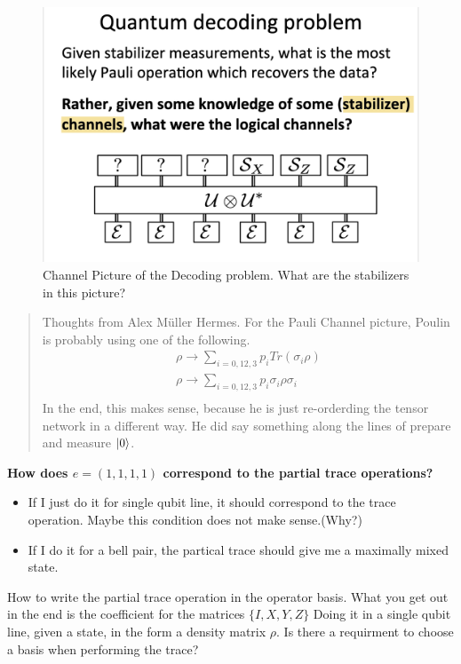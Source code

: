 \documentclass[%
 reprint,
amsmath,amssymb,
aps,
onecolumn,
]{revtex4-2}
\begin{document}
\begin{figure}[ht]
    \centering
    \includegraphics[scale=0.3]{../assets/decoding_channel_picture.png}
    \caption{Channel Picture of the Decoding problem. \textcolor{BrickRed}{What are the stabilizers in this picture?}}
    \label{fig:decode-channel-picture}
\end{figure}


\begin{quote}
    Thoughts from Alex Müller Hermes. For the Pauli Channel picture, Poulin is probably using one of the following. 
    \begin{align*}
        \rho \rightarrow \sum_{i = {0,1 2,3}} p_i Tr(\sigma_i \rho) \\
        \rho \rightarrow \sum_{i = {0,1 2,3}} p_i  \sigma_i \rho \sigma_i  \\
    \end{align*}
    In the end, this makes sense, because he is just re-orderding the tensor network in a different way. He did say something along the lines of prepare and measure $\ket{0}$.
\end{quote}

\textbf{How does $e = (1,1,1,1)$ correspond to the partial trace operations?}
\begin{itemize}
    \item If I just do it for single qubit line, it should correspond to the trace operation. Maybe this condition does not make sense.(Why?)
    \item If I do it for a bell pair, the partical trace should give me a maximally mixed state.
\end{itemize}

How to write the partial trace operation in the operator basis. What you get out in the end is the coefficient for the matrices $\{I, X, Y, Z\}$
Doing it in a single qubit line, given a state, in the form a density matrix $\rho$. Is there a requirment to choose a basis when performing the trace?
\end{document}
